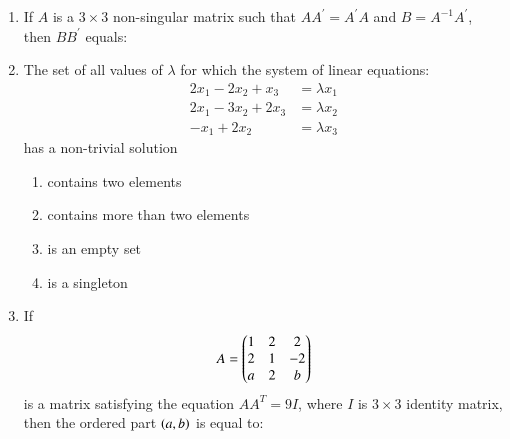\documentclass[journal,12pt,twocolumn]{IEEEtran}
\theoremstyle{remark}
\begin{document}
\begin{enumerate}
	\item If $A$ is a $3\times3$ non-singular matrix such that $AA^{\prime}=A^{\prime}A$ and $B=A^{-1}A^{\prime}$, then $BB^{\prime}$ equals:
	\hfill {}{\par}
	\begin{enumerate}
        \end{enumerate}


    \item The set of all values of $\lambda$ for which the system of linear equations:
	\begin{align*}
		2x_1-2x_2+x_3 &= \lambda x_1\\
		2x_1-3x_2+2x_3 &= \lambda x_2\\
		-x_1+2x_2 &= \lambda x_3
	\end{align*}
	has a non-trivial solution

	\hfill{\brak{JEE M 2015}}
	\begin{enumerate}
		\item contains two elements
		\item contains more than two elements
		\item is an empty set
		\item is a singleton
	\end{enumerate}


	\item If \begin{align*} A = \begin{pmatrix}1&2&2\\2&1&-2\\a&2&b\end{pmatrix} \end{align*} is a matrix satisfying the equation $AA^T = 9I$, where $I$ is $3\times3$ identity matrix, then the ordered part $\left(a,b\right)$ is equal to:
	\hfill {}{\par}
	\begin{enumerate}


\end{enumerate}
\end{enumerate}
\end{document}
